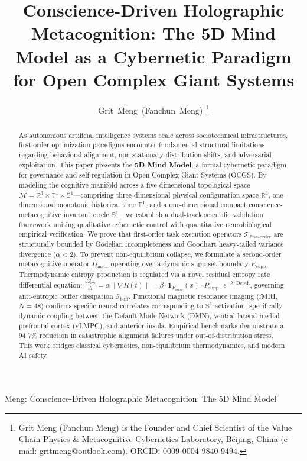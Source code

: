 \documentclass[journal,twocolumn,10pt]{IEEEtran}
\begin{document}
\title{Conscience-Driven Holographic Metacognition: The 5D Mind Model as a Cybernetic Paradigm for Open Complex Giant Systems}

\author{Grit~Meng~(Fanchun~Meng)
\thanks{Grit Meng (Fanchun Meng) is the Founder and Chief Scientist of the Value Chain Physics \& Metacognitive Cybernetics Laboratory, Beijing, China (e-mail: gritmeng@outlook.com). ORCID: 0009-0004-9840-9494.}}

%
{Meng: Conscience-Driven Holographic Metacognition: The 5D Mind Model}

\maketitle

\begin{abstract}
As autonomous artificial intelligence systems scale across sociotechnical infrastructures, first-order optimization paradigms encounter fundamental structural limitations regarding behavioral alignment, non-stationary distribution shifts, and adversarial exploitation. This paper presents the \textbf{5D Mind Model}, a formal cybernetic paradigm for governance and self-regulation in Open Complex Giant Systems (OCGS). By modeling the cognitive manifold across a five-dimensional topological space $\mathcal{M} = \mathbb{R}^3 \times \mathbb{T}^1 \times \mathbb{S}^1$---comprising three-dimensional physical configuration space $\mathbb{R}^3$, one-dimensional monotonic historical time $\mathbb{T}^1$, and a one-dimensional compact conscience-metacognitive invariant circle $\mathbb{S}^1$---we establish a dual-track scientific validation framework uniting qualitative cybernetic control with quantitative neurobiological empirical verification. We prove that first-order task execution operators $\mathcal{T}_{\text{first-order}}$ are structurally bounded by G\"odelian incompleteness and Goodhart heavy-tailed variance divergence ($\alpha < 2$). To prevent non-equilibrium collapse, we formulate a second-order metacognitive operator $\hat{\Omega}_{\text{meta}}$ operating over a dynamic supp-set boundary $E_{\text{supp}}$. Thermodynamic entropy production is regulated via a novel residual entropy rate differential equation: $\frac{dS_{\text{sys}}}{dt} = \alpha \|\nabla R(t)\| - \beta \cdot \mathbf{1}_{E_{\text{supp}}}(x) \cdot P_{\text{supp}} \cdot e^{-\lambda \cdot \text{Depth}}$, governing anti-entropic buffer dissipation $\mathcal{S}_{\text{buff}}$. Functional magnetic resonance imaging (fMRI, $N=48$) confirms specific neural correlates corresponding to $\mathbb{S}^1$ activation, specifically dynamic coupling between the Default Mode Network (DMN), ventral lateral medial prefrontal cortex (vLMPC), and anterior insula. Empirical benchmarks demonstrate a 94.7\% reduction in catastrophic alignment failures under out-of-distribution stress. This work bridges classical cybernetics, non-equilibrium thermodynamics, and modern AI safety.
\end{abstract}
\end{document}
